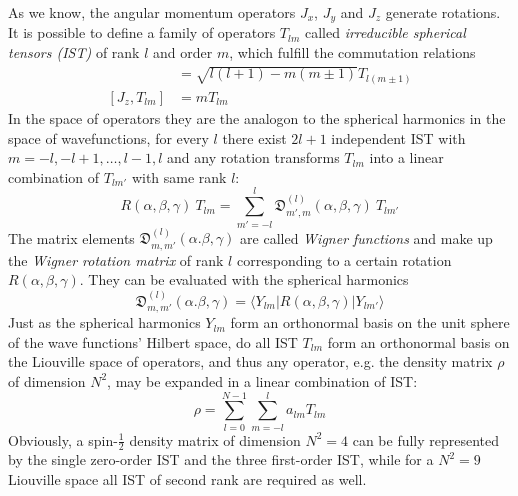 \documentclass[11.5pt,a4paper]{article}
\begin{document}
As we know, the angular momentum operators $J_x$, $J_y$ and $J_z$ generate rotations. It is possible to define a family of operators $T_{lm}$ called \emph{irreducible spherical tensors (IST)} of rank $l$ and order $m$, which fulfill the commutation relations
\begin{align}
 [J_\pm,T_{lm}] & = \sqrt{l(l+1)-m(m\pm1)} T_{l(m\pm1)} \\
  [J_z, T_{lm}] & = m T_{lm}
  \label{eq-tlm-commutators}
\end{align}
In the space of operators they are the analogon to the spherical harmonics in the space of wavefunctions, for every $l$ there exist $2l+1$ independent IST with $m = -l, -l+1, \dots , l-1, l$ and any rotation transforms $T_{lm}$ into a linear combination of $T_{lm'}$ with same rank $l$:
\begin{equation}
 R(\alpha,\beta,\gamma) \ T_{lm} = \sum_{m'=-l}^l \mathfrak{D}_{m',m}^{(l)}(\alpha,\beta,\gamma) \ T_{lm'}
  \label{eq-wigner-rotation}
\end{equation}
The matrix elements $\mathfrak{D}_{m,m'}^{(l)}(\alpha.\beta,\gamma)$ are called \emph{Wigner functions} and make up the \emph{Wigner rotation matrix} of rank $l$ corresponding to a certain rotation $R(\alpha,\beta,\gamma)$. They can be evaluated with the spherical harmonics
\begin{equation}
 \mathfrak{D}_{m,m'}^{(l)}(\alpha.\beta,\gamma) = \langle Y_{lm}|R(\alpha,\beta,\gamma)|Y_{lm'} \rangle
\end{equation}
Just as the spherical harmonics $Y_{lm}$ form an orthonormal basis on the unit sphere of the wave functions' Hilbert space, do all IST $T_{lm}$ form an orthonormal basis on the Liouville space of operators, and thus any operator, e.g. the density matrix $\rho$ of dimension $N^2$, may be expanded in a linear combination of IST:
\begin{equation}
 \rho = \sum_{l=0}^{N-1} \sum_{m=-l}^l a_{lm} T_{lm}
\end{equation}
Obviously, a spin-$\tfrac{1}{2}$ density matrix of dimension $N^2=4$ can be fully represented by the single zero-order IST and the three first-order IST, while for a $N^2=9$ Liouville space all IST of second rank are required as well. 
\end{document}
